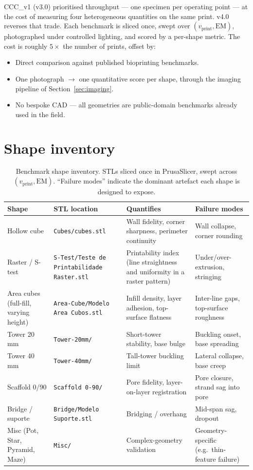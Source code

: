 \documentclass[11pt,a4paper]{article}
\begin{document}
CCC\_v1 (v3.0) prioritised throughput --- one specimen per
operating point --- at the cost of measuring four heterogeneous
quantities on the same print. v4.0 reverses that trade. Each
benchmark is sliced once, swept over $(v_\mathrm{print},
\mathrm{EM})$, photographed under controlled lighting, and scored
by a per-shape metric. The cost is roughly $5\times$ the number of
prints, offset by:
\begin{itemize}[leftmargin=1.4em,itemsep=2pt]
\item Direct comparison against published bioprinting benchmarks.
\item One photograph $\to$ one quantitative score per shape,
through the imaging pipeline of Section~\ref{sec:imaging}.
\item No bespoke CAD --- all geometries are public-domain
benchmarks already used in the field.
\end{itemize}

\section{Shape inventory}
\label{sec:shapes}

\begin{table}[h]
\centering
\small
\begin{tabular}{p{2.6cm} p{4.4cm} p{4.6cm} p{3.4cm}}
\toprule
Shape & STL location & Quantifies & Failure modes \\
\midrule
Hollow cube & \texttt{Cubes/cubes.stl} &
  Wall fidelity, corner sharpness, perimeter continuity &
  Wall collapse, corner rounding \\
Raster / S-test & \texttt{S-Test/Teste de Printabilidade Raster.stl} &
  Printability index (line straightness and uniformity in a raster
  pattern) &
  Under/over-extrusion, stringing \\
Area cubes (full-fill, varying height) &
  \texttt{Area-Cube/Modelo Area Cubos.stl} &
  Infill density, layer adhesion, top-surface flatness &
  Inter-line gaps, top-surface roughness \\
Tower 20\,mm & \texttt{Tower-20mm/} &
  Short-tower stability, base bulge &
  Buckling onset, base spreading \\
Tower 40\,mm & \texttt{Tower-40mm/} &
  Tall-tower buckling limit &
  Lateral collapse, base creep \\
Scaffold 0/90 & \texttt{Scaffold 0-90/} &
  Pore fidelity, layer-on-layer registration &
  Pore closure, strand sag into pore \\
Bridge / suporte & \texttt{Bridge/Modelo Suporte.stl} &
  Bridging / overhang &
  Mid-span sag, dropout \\
Misc (Pot, Star, Pyramid, Maze) & \texttt{Misc/} &
  Complex-geometry validation &
  Geometry-specific (e.g.\ thin-feature failure) \\
\bottomrule
\end{tabular}
\caption{Benchmark shape inventory. STLs sliced once in PrusaSlicer,
swept across $(v_\mathrm{print}, \mathrm{EM})$. ``Failure modes''
indicate the dominant artefact each shape is designed to expose.}
\label{tab:shapes}
\end{table}
\end{document}
